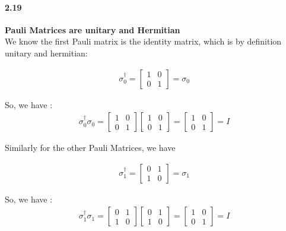 



\paragraph{2.19} \textbf{Pauli Matrices are unitary and Hermitian} \\%
We know the first Pauli matrix is the identity matrix, which is by definition unitary and hermitian:

\begin{align}
  \label{eq:2.19.1}
  \sigma_0^{\dagger} = 
  \begin{bmatrix}
    1 & 0 \\
    0 & 1
  \end{bmatrix} = \sigma_0
\end{align} 


So, we have :
\begin{align}
    \sigma_0^{\dagger} \sigma_0 = 
    \begin{bmatrix}
        1 & 0 \\
        0 & 1
    \end{bmatrix}
    \begin{bmatrix}
        1 & 0 \\
        0 & 1
    \end{bmatrix}
    =
    \begin{bmatrix}
        1 & 0 \\
        0 & 1
    \end{bmatrix} = I
\end{align}

Similarly for the other Pauli Matrices, we have


\begin{align}
  \label{eq:2.19.2}
  \sigma_1^{\dagger} = 
  \begin{bmatrix}
    0 & 1 \\
    1 & 0
  \end{bmatrix} = \sigma_1
\end{align} 


So, we have :
\begin{align}
    \sigma_1^{\dagger} \sigma_1 = 
    \begin{bmatrix}
        0 & 1 \\
        1 & 0
    \end{bmatrix}
    \begin{bmatrix}
        0 & 1 \\
        1 & 0
    \end{bmatrix}
    =
    \begin{bmatrix}
        1 & 0 \\
        0 & 1
    \end{bmatrix} = I
\end{align}

